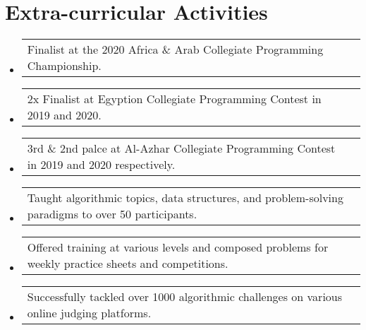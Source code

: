 \documentclass[letterpaper, 11pt]{article}
\makeatletter
\newcommand{\extracurricularactivity}[3] {
	\vspace{1pt}\item
  \begin{tabular*}{0.97\textwidth}[t]{l@{\extracolsep{\fill}}r}
		#1 & \href{#2}{\color{RoyalBlue}#3} \\
  \end{tabular*}
  \vspace{-4pt}
}
\makeatother
\begin{document}
\section{Extra-curricular Activities}
\begin{itemize}[leftmargin=*]
  \extracurricularactivity
  {Finalist at the 2020 Africa \& Arab Collegiate Programming Championship.}
  {https://icpc.global/ICPCID/S6R4YNB7PW7D}{\faIcon{link}}

  \extracurricularactivity
  {2x Finalist at Egyption Collegiate Programming Contest in 2019 and 2020.}
  {}{}

  \extracurricularactivity
  {3rd \& 2nd palce at Al-Azhar Collegiate Programming Contest in 2019 and 2020 respectively.}
  {}{}

  \extracurricularactivity
  {Taught algorithmic topics, data structures, and problem-solving paradigms to over 50 participants.}
  {https://sites.google.com/view/azharicpc/home}{\faIcon{link}}

  \extracurricularactivity
  {Offered training at various levels and composed problems for weekly practice sheets and competitions.}
  {}{}

  \extracurricularactivity
  {Successfully tackled over 1000 algorithmic challenges on various online judging platforms.}
  {}{}
 \end{itemize}

\end{document}
